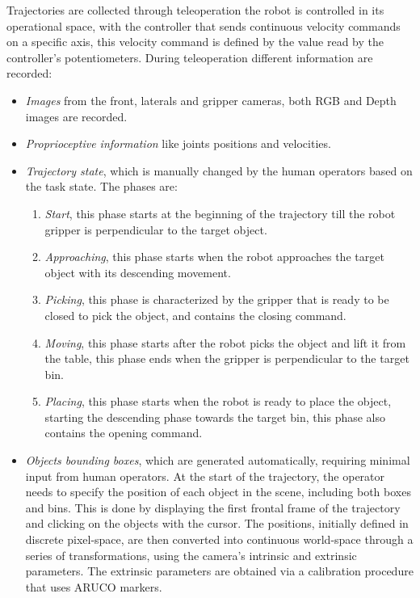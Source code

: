 
Trajectories are collected through teleoperation the robot is controlled in its operational space, with the controller that sends continuous velocity commands on a specific axis, this velocity command is defined by the value read by the controller's potentiometers.
During teleoperation different information are recorded:
\begin{itemize}
    \item \textit{Images} from the front, laterals and gripper cameras, both RGB and Depth images are recorded.
    \item \textit{Proprioceptive information} like joints positions and velocities.
    \item \textit{Trajectory state}, which is manually changed by the human operators based on the task state. The phases are:
        \begin{enumerate}
            \item \textit{Start}, this phase starts at the beginning of the trajectory till the robot gripper is perpendicular to the target object.
            \item \textit{Approaching}, this phase starts when the robot approaches the target object with its descending movement.
            \item \textit{Picking}, this phase is characterized by the gripper that is ready to be closed to pick the object, and contains the closing command.
            \item \textit{Moving}, this phase starts after the robot picks the object and lift it from the table, this phase ends when the gripper is perpendicular to the target bin.
            \item \textit{Placing}, this phase starts when the robot is ready to place the object, starting the descending phase towards the target bin, this phase also contains the opening command.
        \end{enumerate}
    \item \textit{Objects bounding boxes}, which are generated automatically, requiring minimal input from human operators. At the start of the trajectory, the operator needs to specify the position of each object in the scene, including both boxes and bins. This is done by displaying the first frontal frame of the trajectory and clicking on the objects with the cursor. The positions, initially defined in discrete pixel-space, are then converted into continuous world-space through a series of transformations, using the camera's intrinsic and extrinsic parameters. The extrinsic parameters are obtained via a calibration procedure that uses ARUCO markers.
\end{itemize}
